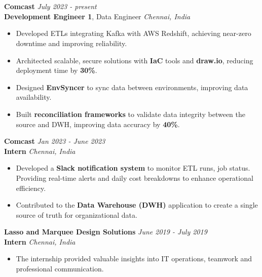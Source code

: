 \documentclass[a4paper,10pt]{article}
\begin{document}
\section{\scshape\color{Fuchsia}{\faUserTie\ \textbf EXPERIENCE}}
\textbf{Comcast} \href{https://corporate.comcast.com/}{} \hfill
\textit{July 2023 - present} \\
\textbf{Development Engineer 1}, Data Engineer \hfill \textit{Chennai, India}
\vspace{-2mm}
\begin{itemize}
    \item Developed ETLs integrating Kafka with AWS Redshift, achieving near-zero downtime and improving reliability.
    \vspace{-2mm}
    \item Architected scalable, secure solutions with \textbf{IaC} tools and \textbf{draw.io}, reducing deployment time by \textbf{30\%}.
    \vspace{-2mm}
    \item Designed \textbf{EnvSyncer} to sync data between environments, improving data availability.
    \vspace{-2mm}
    \item Built \textbf{reconciliation frameworks} to validate data integrity between the source and DWH, improving data accuracy by \textbf{40\%}.
\end{itemize}
\textbf{Comcast} \href{https://drive.google.com/file/d/1pad_OUtVNHKm3s1Kb-_xwyZAXJBjz7gX/view?usp=sharing}{} \hfill \textit{Jan 2023 - June 2023} \\
\textbf{Intern} \hfill \textit{Chennai, India}
\vspace{-2mm}
\begin{itemize}
    \item Developed a \textbf{Slack notification system} to monitor ETL runs, job status. Providing real-time alerts and daily cost breakdowns to enhance operational efficiency.
    \vspace{-2mm}
    \item Contributed to the \textbf{Data Warehouse (DWH)} application to create a single source of truth for organizational data.
\end{itemize}
\textbf{Lasso and Marquee Design Solutions} \href{https://drive.google.com/file/d/1fMTBkQUhU6_34D5mxVZRf7wBHGMJPdVi/view?usp=sharing}{} \hfill \textit{June 2019 - July 2019} \\
\textbf{Intern} \hfill \textit{Chennai, India}
\vspace{-2mm}
\begin{itemize}
    \item The internship provided valuable insights into IT operations, teamwork and professional communication.
\end{itemize}
\end{document}
